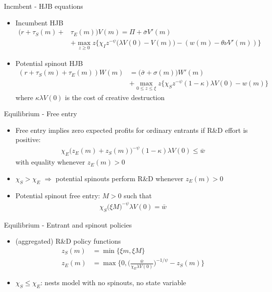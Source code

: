 \documentclass[english,usenames,dvipsnames]{beamer}
\begin{document}
\begin{frame}{Incmbent - HJB equations}
\begin{itemize}
	\item Incumbent HJB
	\small
	\begin{align*}
		(r + \tau_S(m) + &\tau_E(m)) V(m) = \Pi + \bar{\sigma}V'(m)  \\
		                                &+ \max_{z \ge 0} z \Bigg\{ \chi_I z^{-\psi} \Big( \lambda V(0) - V(m) \Big) - (w(m) - \theta \nu V'(m))   \Bigg\}
	\end{align*}
	\normalsize
	\item Potential spinout HJB
	\small
	\begin{align*}
		(r + \tau_S(m) + \tau_E(m)) W(m) &= \Big( \bar{\sigma} + \sigma(m) \Big)W'(m)  \\
										&+ \max_{0 \le z \le \xi} z \Bigg\{ \chi_S z^{-\psi} (1-\kappa) \lambda  V(0) - w(m)  \Bigg\}
	\end{align*}
	\normalsize
	where $\kappa \lambda V(0)$ is the cost of creative destruction 
\end{itemize}
\end{frame}

\begin{frame}{Equilibrium - Free entry}
\begin{itemize}
	\item Free entry implies zero expected profits for ordinary entrants if R\&D effort is positive:
	\begin{align*}
		\chi_E \Big(z_E(m) + z_S(m) \Big)^{-\psi} (1-\kappa) \lambda V(0) \le \bar{w}
	\end{align*} 
	with equality whenever $z_E(m) > 0$
	\item $\chi_S > \chi_E$ $\Rightarrow$ potential spinouts perform R\&D whenever $z_E(m) > 0$
	\item Potential spinout free entry: $M > 0$ such that
	\begin{align*}
		\chi_S \big( \xi M \big)^{-\psi} \lambda V(0) = \bar{w}
	\end{align*}
\end{itemize}
\end{frame}

\begin{frame}{Equilibrium - Entrant and spinout policies}
\begin{itemize}
	\item (aggregated) R\&D policy functions
	\begin{align*}
	z_S(m) &= \min \Big\{\xi m, \xi M \Big\} \\
	z_E(m) &= \max\Bigg\{0, \Bigg(\frac{\bar{w}}{\chi_E\lambda V(0)}\Bigg)^{-1/\psi} - z_S(m) \Bigg\}
	\end{align*}
	\item $\chi_S \le \chi_E$: nests model with no spinouts, no state variable
\end{itemize}
\end{frame}
\end{document}
